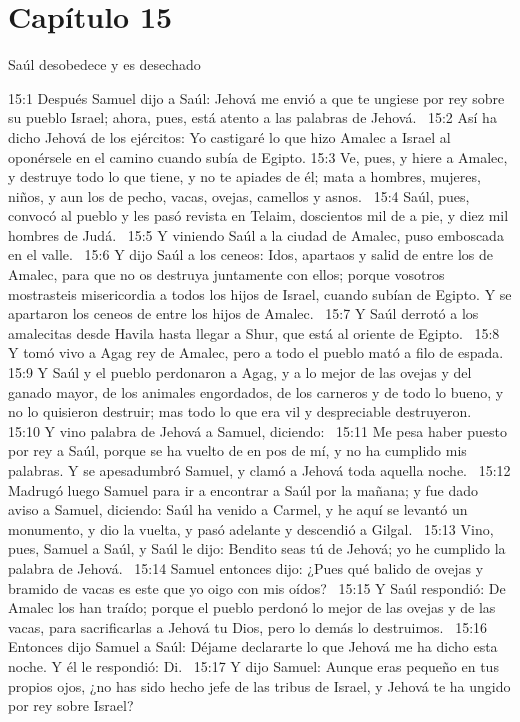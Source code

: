 \section*{Capítulo 15 }
Saúl desobedece y es desechado  

15:1 Después Samuel dijo a Saúl: Jehová me envió a que te ungiese por rey sobre su pueblo Israel; ahora, pues, está atento a las palabras de Jehová.  
15:2 Así ha dicho Jehová de los ejércitos: Yo castigaré lo que hizo Amalec a Israel al oponérsele en el camino cuando subía de Egipto. 
15:3 Ve, pues, y hiere a Amalec, y destruye todo lo que tiene, y no te apiades de él; mata a hombres, mujeres, niños, y aun los de pecho, vacas, ovejas, camellos y asnos.  
15:4 Saúl, pues, convocó al pueblo y les pasó revista en Telaim, doscientos mil de a pie, y diez mil hombres de Judá.  
15:5 Y viniendo Saúl a la ciudad de Amalec, puso emboscada en el valle.  
15:6 Y dijo Saúl a los ceneos: Idos, apartaos y salid de entre los de Amalec, para que no os destruya juntamente con ellos; porque vosotros mostrasteis misericordia a todos los hijos de Israel, cuando subían de Egipto. Y se apartaron los ceneos de entre los hijos de Amalec.  
15:7 Y Saúl derrotó a los amalecitas desde Havila hasta llegar a Shur, que está al oriente de Egipto.  
15:8 Y tomó vivo a Agag rey de Amalec, pero a todo el pueblo mató a filo de espada.  
15:9 Y Saúl y el pueblo perdonaron a Agag, y a lo mejor de las ovejas y del ganado mayor, de los animales engordados, de los carneros y de todo lo bueno, y no lo quisieron destruir; mas todo lo que era vil y despreciable destruyeron.  
15:10 Y vino palabra de Jehová a Samuel, diciendo:  
15:11 Me pesa haber puesto por rey a Saúl, porque se ha vuelto de en pos de mí, y no ha cumplido mis palabras. Y se apesadumbró Samuel, y clamó a Jehová toda aquella noche.  
15:12 Madrugó luego Samuel para ir a encontrar a Saúl por la mañana; y fue dado aviso a Samuel, diciendo: Saúl ha venido a Carmel, y he aquí se levantó un monumento, y dio la vuelta, y pasó adelante y descendió a Gilgal.  
15:13 Vino, pues, Samuel a Saúl, y Saúl le dijo: Bendito seas tú de Jehová; yo he cumplido la palabra de Jehová.  
15:14 Samuel entonces dijo: ¿Pues qué balido de ovejas y bramido de vacas es este que yo oigo con mis oídos?  
15:15 Y Saúl respondió: De Amalec los han traído; porque el pueblo perdonó lo mejor de las ovejas y de las vacas, para sacrificarlas a Jehová tu Dios, pero lo demás lo destruimos.  
15:16 Entonces dijo Samuel a Saúl: Déjame declararte lo que Jehová me ha dicho esta noche. Y él le respondió: Di.  
15:17 Y dijo Samuel: Aunque eras pequeño en tus propios ojos, ¿no has sido hecho jefe de las tribus de Israel, y Jehová te ha ungido por rey sobre Israel?  
